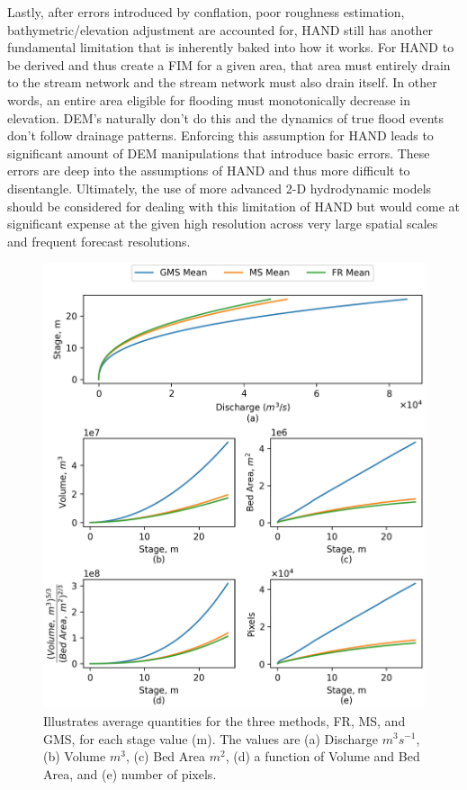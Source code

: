 \documentclass[draft]{dependencies/agujournal2019}
\begin{document}
Lastly, after errors introduced by conflation, poor roughness estimation, bathymetric/elevation adjustment are accounted for, HAND still has another fundamental limitation that is inherently baked into how it works.
For HAND to be derived and thus create a FIM for a given area, that area must entirely drain to the stream network and the stream network must also drain itself.
In other words, an entire area eligible for flooding must monotonically decrease in elevation. 
DEM's naturally don't do this and the dynamics of true flood events don't follow drainage patterns.
Enforcing this assumption for HAND leads to significant amount of DEM manipulations that introduce basic errors.
These errors are deep into the assumptions of HAND and thus more difficult to disentangle.
Ultimately, the use of more advanced 2-D hydrodynamic models should be considered for dealing with this limitation of HAND but would come at significant expense at the given high resolution across very large spatial scales and frequent forecast resolutions.
%
\begin{figure}[h!]
\centering
\includegraphics[scale=1.0]{figures/rating_curve_comparison.jpg}
\caption{Illustrates average quantities for the three methods, FR, MS, and GMS, for each stage value (m). 
The values are (a) Discharge $m^3s^{-1}$, (b) Volume $m^3$, (c) Bed Area $m^2$, (d) a function of Volume and Bed Area, and (e) number of pixels.
}
\label{fig:rating_curve_comparison}
\end{figure}
\end{document}
